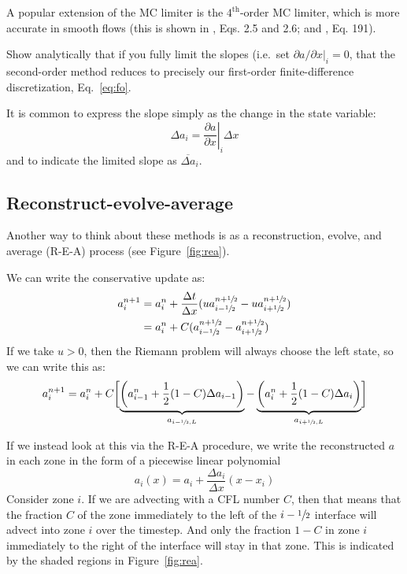 A popular extension of the MC limiter is the $4^\mathrm{th}$-order MC
limiter, which is more accurate in smooth flows (this is shown in
\cite{colella:1985}, Eqs. 2.5 and 2.6; and \cite{colella:1990},
Eq. 191).

\begin{exercise}
{Show analytically that if you fully limit the slopes
  (i.e.\ set $\partial a/\partial x |_i = 0$, that the second-order
  method reduces to precisely our first-order finite-difference discretization,
  Eq.~\ref{eq:fo}.  }
\end{exercise}

It is common to express the slope simply as the change in the state variable:
\begin{equation}
\Delta a_i = \left . \frac{\partial a}{\partial x} \right |_i \Delta x
\end{equation}
and to indicate the limited slope as $\overline{\Delta a}_i$.



\subsection{Reconstruct-evolve-average}

Another way to think about these methods is as a reconstruction,
evolve, and average (R-E-A) process (see Figure~\ref{fig:rea}).  

We can write the conservative update as:
\begin{align}
a_i^{n+1} &= a_i^n + \frac{\Delta t}{\Delta x} 
    (u a^{n+{\sfrac{1}{2}}}_{i-{\sfrac{1}{2}}} - u a^{n+{\sfrac{1}{2}}}_{i+{\sfrac{1}{2}}} ) \\
          &= a_i^n + C (a^{n+{\sfrac{1}{2}}}_{i-{\sfrac{1}{2}}} - a^{n+{\sfrac{1}{2}}}_{i+{\sfrac{1}{2}}} ) 
\end{align}
If we take $u > 0$, then the Riemann problem will always choose the
left state, so we can write this as:
\begin{equation}
a_i^{n+1} = a_i^n + 
     C \biggl [\underbrace{\left (a_{i-1}^n + \frac{1}{2} (1-C) \Delta a_{i-1} \right )}_{a_{i-{\sfrac{1}{2}},L}} -
              \underbrace{\left (a_{i}^n + \frac{1}{2} (1-C) \Delta a_{i} \right )}_{a_{i+{\sfrac{1}{2}},L}}
       \biggr ] \label{eq:rea_orig}
\end{equation}

If we instead look at this via the R-E-A procedure, we write the reconstructed
$a$ in each zone in the form of a piecewise linear polynomial
\begin{equation}
a_i(x) = a_i + \frac{\Delta a_i}{\Delta x} (x - x_i)
\end{equation}
Consider zone $i$.  
If we are advecting with a CFL number $C$, then that means that the fraction
$C$ of the zone immediately to the left of the $i-{\sfrac{1}{2}}$ interface will advect
into zone $i$ over the timestep.  And only the fraction $1-C$ in zone $i$
immediately to the right of the interface will stay in that zone.  This 
is indicated by the shaded regions in Figure~\ref{fig:rea}. 


